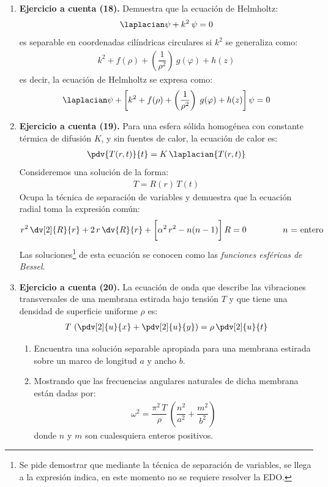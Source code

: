 \begin{enumerate}
\item \textbf{Ejercicio a cuenta (18). } Demuestra que la ecuación de Helmholtz:
\begin{align*}
\laplacian \psi + k^{2} \: \psi = 0
\end{align*}
es separable en coordenadas cilíndricas circulares si $k^{2}$ se generaliza como:
\begin{align*}
k^{2} + f(\rho) + \left( \dfrac{1}{\rho^{2}} \right) \: g(\varphi) + h(z)
\end{align*}
es decir, la ecuación de Helmholtz se expresa como:
\begin{align*}
\laplacian \psi + \bigg[ k^{2} + f(\rho) + \left( \dfrac{1}{\rho^{2}} \right) \: g(\varphi) + h(z) \bigg] \, \psi = 0
\end{align*}
\item \textbf{Ejercicio a cuenta (19). } Para una esfera sólida homogénea con constante térmica de difusión $K$, y sin fuentes de calor, la ecuación de calor es:
\begin{align*}
\pdv{T(r,t)}{t} = K \, \laplacian{T(r, t)}
\end{align*}
Consideremos una solución de la forma:
\begin{align*}
T = R(r) \, T(t)
\end{align*}
Ocupa la técnica de separación de variables y demuestra que la ecuación radial toma la expresión común:
\begin{align*}
r^{2} \, \dv[2]{R}{r} + 2 \, r \, \dv{R}{r} + \bigg[ \alpha^{2} \, r^{2} - n (n - 1) \bigg] \, R = 0 \hspace{1.5cm} n \mbox{ = entero}
\end{align*}
Las soluciones\footnote{Se pide demostrar que mediante la técnica de separación de variables, se llega a la expresión indica, en este momento no se requiere resolver la EDO.} de esta ecuación se conocen como las \emph{funciones esféricas de Bessel}.
\item \textbf{Ejercicio a cuenta (20). } La ecuación de onda que describe las vibraciones transversales de una membrana estirada bajo tensión $T$ y que tiene una densidad de superficie uniforme $\rho$ es:
\begin{align*}
T \, \left( \pdv[2]{u}{x} + \pdv[2]{u}{y} \right) = \rho \, \pdv[2]{u}{t}
\end{align*}
\begin{enumerate}[label=\alph*)]
\item Encuentra una solución separable apropiada para una membrana estirada sobre un marco de longitud $a$ y ancho $b$.
\item Mostrando que las frecuencias angulares naturales de dicha membrana están dadas por:
\begin{align*}
    \omega^{2} = \dfrac{\pi^{2} \, T}{\rho} \, \left( \dfrac{n^{2}}{a^{2}} + \dfrac{m^{2}}{b^{2}} \right)
\end{align*}
donde $n$ y $m$ son cualesquiera enteros positivos.
\end{enumerate}
\end{enumerate}
